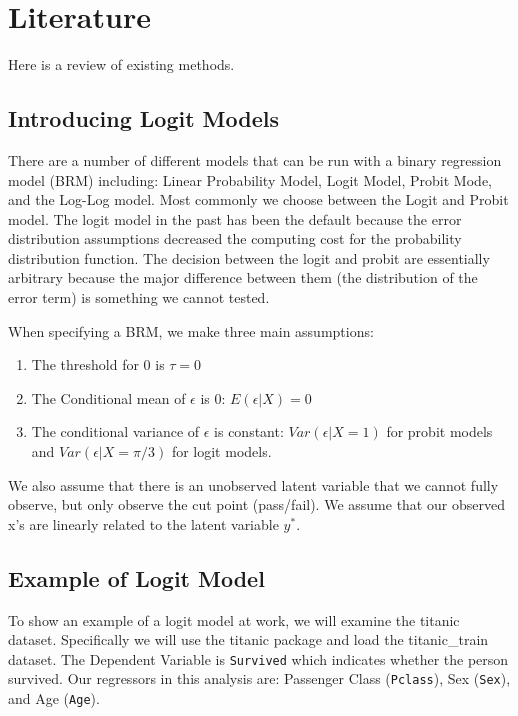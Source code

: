 \documentclass[]{book}
\providecommand{\tightlist}{%
  \setlength{\itemsep}{0pt}\setlength{\parskip}{0pt}}
\begin{document}
\chapter{Literature}\label{literature}

Here is a review of existing methods.

\section{Introducing Logit Models}\label{introducing-logit-models}

There are a number of different models that can be run with a binary
regression model (BRM) including: Linear Probability Model, Logit Model,
Probit Mode, and the Log-Log model. Most commonly we choose between the
Logit and Probit model. The logit model in the past has been the default
because the error distribution assumptions decreased the computing cost
for the probability distribution function. The decision between the
logit and probit are essentially arbitrary because the major difference
between them (the distribution of the error term) is something we cannot
tested.

When specifying a BRM, we make three main assumptions:

\begin{enumerate}
\def\labelenumi{\arabic{enumi}.}
\tightlist
\item
  The threshold for 0 is \(\tau = 0\)
\item
  The Conditional mean of \(\epsilon\) is 0: \(E(\epsilon | X) = 0\)
\item
  The conditional variance of \(\epsilon\) is constant:
  \(Var(\epsilon|X = 1)\) for probit models and
  \(Var(\epsilon|X = \pi/3)\) for logit models.
\end{enumerate}

We also assume that there is an unobserved latent variable that we
cannot fully observe, but only observe the cut point (pass/fail). We
assume that our observed x's are linearly related to the latent variable
\(y^*\).

\section{Example of Logit Model}\label{example-of-logit-model}

To show an example of a logit model at work, we will examine the titanic
dataset. Specifically we will use the titanic package and load the
titanic\_train dataset. The Dependent Variable is \texttt{Survived}
which indicates whether the person survived. Our regressors in this
analysis are: Passenger Class (\texttt{Pclass}), Sex (\texttt{Sex}), and
Age (\texttt{Age}).
\end{document}
